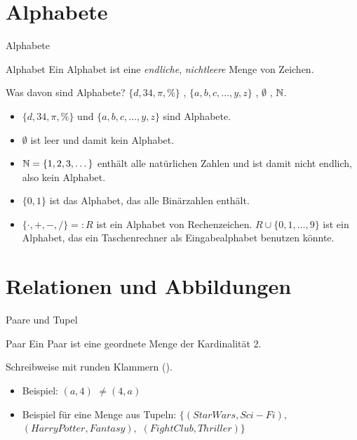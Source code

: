 \documentclass{beamer}
\begin{document}
\section{Alphabete}
\begin{frame}{Alphabete}
	
	 
	
	\begin{block}{Alphabet}
		Ein Alphabet ist eine \emph{endliche}, \emph{nichtleere} Menge von Zeichen.
	\end{block}
	
	 
	
	Was davon sind Alphabete?   $\{d, 34, \pi, \%\}$  , $\{a, b, c, \dots, y, z\}$  , $\emptyset$  , $\mathbb{N}$.
	
	\begin{itemize}
		\item $\{d, 34, \pi, \%\}$ und $\{a, b, c, \dots, y, z\}$ sind Alphabete.
		\item $\emptyset$ ist leer und damit kein Alphabet.
		\item $\mathbb{N} = \{1, 2, 3, \dots\}$ enthält alle natürlichen Zahlen und ist damit nicht endlich, also kein Alphabet.
		\item $\{0, 1\}$ ist das Alphabet, das alle Binärzahlen enthält.
		\item $\{\cdot, +, -, /\} =: R$ ist ein Alphabet von Rechenzeichen.  $R \cup \{0, 1, \dots, 9\}$ ist ein Alphabet, das ein Taschenrechner als Eingabealphabet benutzen könnte.
	\end{itemize}
\end{frame}

\section{Relationen und Abbildungen}
\begin{frame}{Paare und Tupel}
	 
	\begin{block}{Paar}
		Ein Paar ist eine geordnete Menge der Kardinalität 2.
	\end{block}
	 
	Schreibweise mit runden Klammern ().
	\begin{itemize}
		\item Beispiel: $(a, 4)$  $\neq (4, a)$
		\item Beispiel für eine Menge aus Tupeln: $\{(Star Wars, Sci-Fi),$ $(Harry Potter, Fantasy),$ $(Fight Club, Thriller)\}$
	\end{itemize}
\end{frame}
\end{document}

